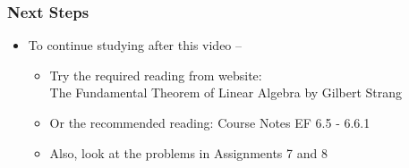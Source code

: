 \documentclass[10pt,english,aspectratio=169]{beamer}
\begin{document}
\begin{frame} \frametitle{Next Steps}

\begin{itemize}
\setlength\itemsep{5mm}
\item To continue studying after this video -- \vspace{2mm}

\begin{itemize}
 \setlength\itemsep{3mm}
  
 \item Try the required reading from website: \\[1mm] \hspace{5mm} The Fundamental Theorem of Linear Algebra by Gilbert Strang
 
 \item Or the recommended reading:  Course Notes EF 6.5 - 6.6.1

 \item Also, look at the problems in Assignments 7 and 8
\end{itemize}
\end{itemize}


\end{frame}
\end{document}
